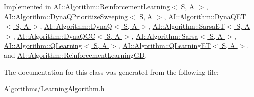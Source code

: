 Implemented in \hyperlink{classAI_1_1Algorithm_1_1ReinforcementLearning_a25d7fa245a79e61061436dc0f1db90cb}{A\-I\-::\-Algorithm\-::\-Reinforcement\-Learning$<$ S, A $>$}, \hyperlink{classAI_1_1Algorithm_1_1DynaQPrioritizeSweeping_ad08b55f3cf927189dd31abf9fc1c2959}{A\-I\-::\-Algorithm\-::\-Dyna\-Q\-Prioritize\-Sweeping$<$ S, A $>$}, \hyperlink{classAI_1_1Algorithm_1_1DynaQET_a53b0e06842fbb802acfa5384a84ad448}{A\-I\-::\-Algorithm\-::\-Dyna\-Q\-E\-T$<$ S, A $>$}, \hyperlink{classAI_1_1Algorithm_1_1DynaQ_a4542226b17db4ed8a2c5ec17d37dc42f}{A\-I\-::\-Algorithm\-::\-Dyna\-Q$<$ S, A $>$}, \hyperlink{classAI_1_1Algorithm_1_1SarsaET_adf13376b7ec8fdfa2b19ffadb1aa81e7}{A\-I\-::\-Algorithm\-::\-Sarsa\-E\-T$<$ S, A $>$}, \hyperlink{classAI_1_1Algorithm_1_1DynaQCC_ae23b8f0afbb9fc5024aef9ce720c9b84}{A\-I\-::\-Algorithm\-::\-Dyna\-Q\-C\-C$<$ S, A $>$}, \hyperlink{classAI_1_1Algorithm_1_1Sarsa_ae1d62478d3e31cace3fb594e05f83d1c}{A\-I\-::\-Algorithm\-::\-Sarsa$<$ S, A $>$}, \hyperlink{classAI_1_1Algorithm_1_1QLearning_a042e1987ce21a94f59603c4cb1eeed82}{A\-I\-::\-Algorithm\-::\-Q\-Learning$<$ S, A $>$}, \hyperlink{classAI_1_1Algorithm_1_1QLearningET_a9a245dcb3ca8f26b37e5a6daa6d4a898}{A\-I\-::\-Algorithm\-::\-Q\-Learning\-E\-T$<$ S, A $>$}, and \hyperlink{classAI_1_1Algorithm_1_1ReinforcementLearningGD_afca8d60ac090dec611f3834c0e8872c0}{A\-I\-::\-Algorithm\-::\-Reinforcement\-Learning\-G\-D}.



The documentation for this class was generated from the following file\-:\begin{DoxyCompactItemize}
\item 
Algorithms/Learning\-Algorithm.\-h\end{DoxyCompactItemize}
